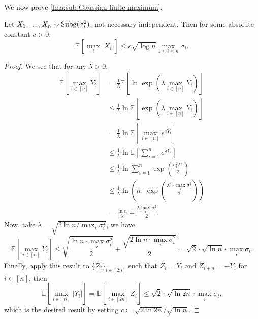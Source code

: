 We now prove \autoref{lma:sub-Gaussian-finite-maximum}.

\begin{lemma}\label{pf-lma:sub-Gaussian-finite-maximum}
	Let \(X_1, \dots , X_n \sim \operatorname{Subg}(\sigma _i^{2} ) \), not necessary independent. Then for some absolute constant \(c > 0\),
	\[
		\mathbb{E}_{}\left[\max _i \vert X_i \vert \right] \leq c \sqrt{\log n} \max _{1 \leq i \leq n} \sigma _i.
	\]
\end{lemma}
\begin{proof}
	We see that for any \(\lambda > 0\),
	\begin{align*}
		\mathbb{E}_{}\left[\max _{i\in [n]} Y_i\right]
		 & = \frac{1}{\lambda} \mathbb{E}_{}\left[\ln \exp \left( \lambda \max _{i\in [n]} Y_i \right)  \right]                               \\
		 & \leq \frac{1}{\lambda} \ln \mathbb{E}_{}\left[\exp \left( \lambda \max _{i\in [n]} Y_i \right)  \right] \tag*{Jensen's inequality} \\
		 & = \frac{1}{\lambda} \ln \mathbb{E}_{}\left[\max _{i\in [n]} e^{sY_i} \right]                                                       \\
		 & \leq \frac{1}{\lambda} \ln \mathbb{E}_{}\left[\sum_{i=1}^{n} e^{\lambda Y_i} \right]                                               \\
		 & \leq \frac{1}{\lambda} \ln \sum_{i=1}^{n} \exp \left( \frac{\sigma _i^2 \lambda ^2}{2} \right)                                     \\
		 & \leq \frac{1}{\lambda } \ln \left( n\cdot \exp \left( \frac{\lambda^2\cdot \max _i \sigma _i^2}{2} \right) \right)                 \\
		 & = \frac{\ln n}{\lambda } + \frac{\lambda \max _i \sigma _i^2}{2}.
	\end{align*}
	Now, take \(\lambda = \sqrt{2 \ln n / \max _i \sigma_i^2 } \), we have
	\[
		\mathbb{E}_{}\left[\max _{i\in [n]} Y_i \right]
		\leq \sqrt{\frac{\ln n \cdot \max _i \sigma _i^2}{2}} + \frac{\sqrt{2 \ln n \cdot \max _i \sigma _i^2} }{2}
		= \sqrt{2} \cdot \sqrt{\ln n} \cdot \max _i \sigma _i.
	\]
	Finally, apply this result to \(\{ Z_i \} _{i\in [2n]}\) such that \(Z_i = Y_i\) and \(Z_{i+n} = -Y_i\) for \(i\in [n]\), then
	\[
		\mathbb{E}_{}\left[\max _{i\in [n]} \vert Y_i \vert \right]
		= \mathbb{E}_{}\left[\max _{i\in [2n]} Z_i \right]
		\leq \sqrt{2}\cdot \sqrt{\ln 2n} \cdot \max _i \sigma _i ,
	\]
	which is the desired result by setting \(c \coloneqq \sqrt{2 \ln 2n} / \sqrt{\ln n}\).
\end{proof}

